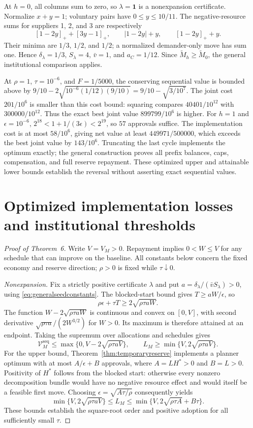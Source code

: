 \documentclass[ecta,draft,supplement]{econsocart}
\theoremstyle{definition}
\theoremstyle{definition}
\begin{document}
\begin{appendix}
At $h=0$, all columns sum to zero, so $\lambda=\mathbf1$ is a
nonexpansion certificate. Normalize $x+y=1$; voluntary pairs have
$0\leq y\leq10/11$. The negative-resource sums for suppliers
1, 2, and 3 are respectively
\[
 [1-2y]_+ +[3y-1]_+,\qquad |1-2y|+y,
 \qquad [1-2y]_++y.
\]
Their minima are $1/3$, $1/2$, and $1/2$; a normalized
demander-only move has sum one. Hence $\delta_\lambda=1/3$,
$S_\lambda=4$, $\bar v=1$, and $a_C=1/12$.
Since $\widetilde M_h\geq\widetilde M_0$, the general
institutional comparison applies.

At $\rho=1$, $\tau=10^{-6}$, and $F=1/5000$, the conserving
sequential value is bounded above by
$9/10-2\sqrt{10^{-6}(1/12)(9/10)}
=9/10-\sqrt{3/10^7}$.
The joint cost $201/10^6$ is smaller than this cost bound:
squaring compares $40401/10^{12}$ with $300000/10^{12}$.
Thus the exact best joint value $899799/10^6$ is higher.
For $h=1$ and $\epsilon=10^{-6}$,
$2^{18}<1+1/(3\epsilon)<2^{19}$, so $57$ approvals suffice.
The implementation cost is at most $58/10^6$, giving net value
at least $449971/500000$, which exceeds the best joint value by
$143/10^6$. Truncating the last cycle implements the optimum
exactly; the general construction proves all prefix balances,
caps, compensation, and full reserve repayment. These optimized
upper and attainable lower bounds establish the reversal without
asserting exact sequential values.

\section{Optimized implementation losses and institutional thresholds}
\label{app:optimizedloss}

\begin{proof}[Proof of Theorem~6%
]
Write $V=V_M>0$. Repayment implies $0<W\leq V$ for any schedule
that can improve on the baseline. All constants below concern the fixed
economy and reserve direction; $\rho>0$ is fixed while $\tau\downarrow0$.

\emph{Nonexpansion.} Fix a strictly positive certificate $\lambda$ and put
$a=\delta_\lambda/(\bar vS_\lambda)>0$, using
\eqref{eq:generalseedconstants}. The blocked-start bound gives
$T\geq aW/\epsilon$, so
\[
 \rho\epsilon+\tau T\geq2\sqrt{\rho\tau aW}.
\]
The function $W-2\sqrt{\rho\tau aW}$ is continuous and convex on
$[0,V]$, with second derivative $\sqrt{\rho\tau a}/(2W^{3/2})$
for $W>0$. Its maximum is therefore attained at an endpoint. Taking the
supremum over allocations and schedules gives
\[
 \mathcal V_M^{\mathrm{seq}}\leq
 \max\{0,V-2\sqrt{\rho\tau aV}\},\qquad
 L_M\geq\min\{V,2\sqrt{\rho\tau aV}\}.
\]
For the upper bound, Theorem~\ref{thm:temporaryreserve} implements a
planner optimum with at most $A/\epsilon+B$ approvals, where
$A=LH^*>0$ and $B=L>0$. Positivity of $H^*$ follows from the blocked
start: otherwise every nonzero decomposition bundle would have no negative
resource effect and would itself be a feasible first move. Choosing
$\epsilon=\sqrt{A\tau/\rho}$ consequently yields
\[
 \min\{V,2\sqrt{\rho\tau aV}\}\leq L_M
 \leq\min\{V,2\sqrt{\rho\tau A}+B\tau\}.
\]
These bounds establish the square-root order and positive adoption for
all sufficiently small $\tau$.


\end{proof}
\end{appendix}
\end{document}
